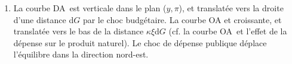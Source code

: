 \documentclass[a4paper,11pt]{article}
\begin{document}
\begin{enumerate}
\item La courbe DA\ est verticale dans le plan ($y,\pi $), et translat\'{e}e
vers la droite d'une distance d$G$ par le choc budg\'{e}taire. La courbe OA
et croissante, et translat\'{e}e vers le bas de la distance $\kappa \xi $d$G$
(cf. la courbe OA\ et l'effet de la d\'{e}pense sur le produit naturel). Le
choc de d\'{e}pense publique d\'{e}place l'\'{e}quilibre dans la direction
nord-est.
\end{enumerate}
\end{document}
